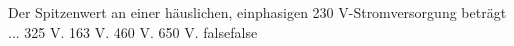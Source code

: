     {Der Spitzenwert an einer häuslichen, einphasigen 230 V-Stromversorgung beträgt ...}
    {325 V.}
    {163 V.}
    {460 V.}
    {650 V.}
    {false}{false}